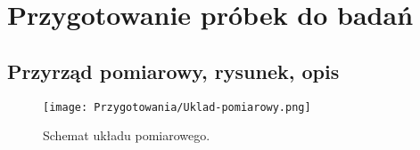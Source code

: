 \newpage

\section{Przygotowanie próbek do badań}

\subsection{Przyrząd pomiarowy, rysunek, opis}
\begin{figure}[H]
	\begin{center}
		\texttt{[image: Przygotowania/Uklad-pomiarowy.png]}
		\caption{Schemat układu pomiarowego.}
	\end{center}
\end{figure}